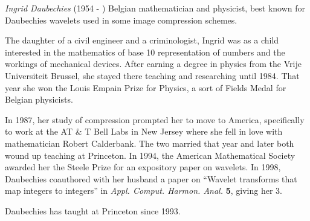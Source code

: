 \documentclass[12pt]{article}
\begin{document}

\emph{Ingrid Daubechies} (1954 - ) Belgian mathematician and physicist, best known for Daubechies wavelets used in some image compression schemes.

The daughter of a civil engineer and a criminologist, Ingrid was as a child interested in the mathematics of base 10 representation of numbers and the workings of mechanical devices. After earning a degree in physics from the Vrije Universiteit Brussel, she stayed there teaching and researching until 1984. That year she won the Louis Empain Prize for Physics, a sort of Fields Medal for Belgian physicists.

In 1987, her study of compression prompted her to move to America, specifically to work at the AT \& T Bell Labs in New Jersey where she fell in love with mathematician Robert Calderbank. The two married that year and later both wound up teaching at Princeton. In 1994, the American Mathematical Society awarded her the Steele Prize for an expository paper on wavelets. In 1998, Daubechies coauthored with her husband a paper on ``Wavelet transforms that map integers to integers'' in {\it Appl. Comput. Harmon. Anal.} {\bf 5}, giving her  3.

Daubechies has taught at Princeton since 1993.
\end{document}
